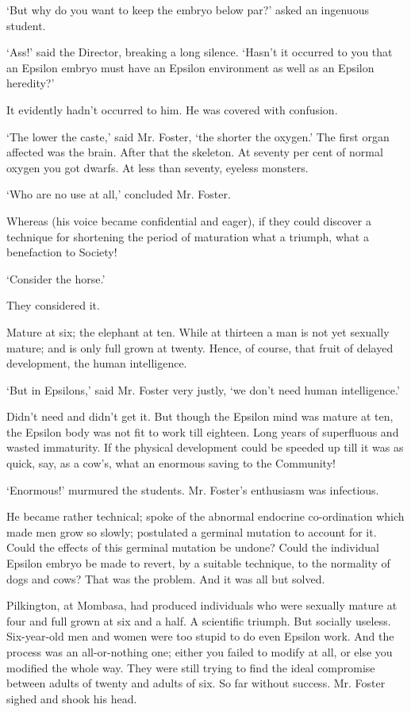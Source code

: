 \documentclass[10pt,a4paper]{article}
\newcommand{\sqm}[1]{‘#1’}
\begin{document}
\sqm{But why do you want to keep the embryo below par?} asked an ingenuous student.

\sqm{Ass!} said the Director, breaking a long silence. \sqm{Hasn't it occurred to you that an Epsilon embryo must have an Epsilon environment as well as an Epsilon heredity?}

It evidently hadn't occurred to him. He was covered with confusion.

\sqm{The lower the caste,} said Mr. Foster, \sqm{the shorter the oxygen.} The first organ affected was the brain. After that the skeleton. At seventy per cent of normal oxygen you got dwarfs. At less than seventy, eyeless monsters.

\sqm{Who are no use at all,} concluded Mr. Foster.

Whereas (his voice became confidential and eager), if they could discover a technique for shortening the period of maturation what a triumph, what a benefaction to Society!

\sqm{Consider the horse.}

They considered it.

Mature at six; the elephant at ten. While at thirteen a man is not yet sexually mature; and is only full grown at twenty. Hence, of course, that fruit of delayed development, the human intelligence.

\sqm{But in Epsilons,} said Mr. Foster very justly, \sqm{we don't need human intelligence.}

Didn't need and didn't get it. But though the Epsilon mind was mature at ten, the Epsilon body was not fit to work till eighteen. Long years of superfluous and wasted immaturity. If the physical development could be speeded up till it was as quick, say, as a cow's, what an enormous saving to the Community!

\sqm{Enormous!} murmured the students. Mr. Foster's enthusiasm was infectious.

He became rather technical; spoke of the abnormal endocrine co-ordination which made men grow so slowly; postulated a germinal mutation to account for it. Could the effects of this germinal mutation be undone? Could the individual Epsilon embryo be made to revert, by a suitable technique, to the normality of dogs and cows? That was the problem. And it was all but solved.

Pilkington, at Mombasa, had produced individuals who were sexually mature at four and full grown at six and a half. A scientific triumph. But socially useless. Six-year-old men and women were too stupid to do even Epsilon work. And the process was an all-or-nothing one; either you failed to modify at all, or else you modified the whole way. They were still trying to find the ideal compromise between adults of twenty and adults of six. So far without success. Mr. Foster sighed and shook his head.
\end{document}
